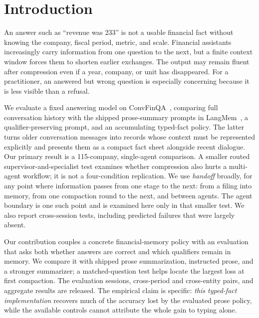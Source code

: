 \documentclass[conference,a4paper]{IEEEtran}
\begin{document}
\section{Introduction}

An answer such as ``revenue was 233'' is not a usable financial fact without knowing the company, fiscal period, metric, and scale. Financial assistants increasingly carry information from one question to the next, but a finite context window forces them to shorten earlier exchanges. The output may remain fluent after compression even if a year, company, or unit has disappeared. For a practitioner, an answered but wrong question is especially concerning because it is less visible than a refusal.

We evaluate a fixed answering model on ConvFinQA~\cite{chen2022convfinqa}, comparing full conversation history with the shipped prose-summary prompts in LangMem~\cite{langmem}, a qualifier-preserving prompt, and an accumulating typed-fact policy. The latter turns older conversation messages into records whose context must be represented explicitly and presents them as a compact fact sheet alongside recent dialogue. Our primary result is a 115-company, single-agent comparison. A smaller routed supervisor-and-specialist test examines whether compression also hurts a multi-agent workflow; it is not a four-condition replication. We use \emph{handoff} broadly, for any point where information passes from one stage to the next: from a filing into memory, from one compaction round to the next, and between agents. The agent boundary is one such point and is examined here only in that smaller test. We also report cross-session tests, including predicted failures that were largely absent.

Our contribution couples a concrete financial-memory policy with an evaluation that asks both whether answers are correct and which qualifiers remain in memory. We compare it with shipped prose summarization, instructed prose, and a stronger summarizer; a matched-question test helps locate the largest loss at first compaction. The evaluation sessions, cross-period and cross-entity pairs, and aggregate results are released. The empirical claim is specific: \emph{this typed-fact implementation} recovers much of the accuracy lost by the evaluated prose policy, while the available controls cannot attribute the whole gain to typing alone.
\end{document}
